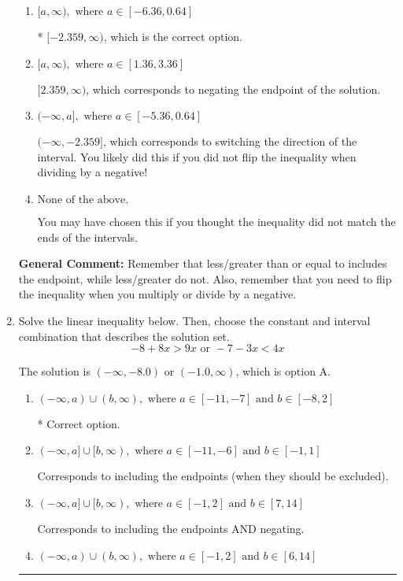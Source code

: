 \documentclass{extbook}[14pt]
\newcommand{\litem}[1]{\item #1

\rule{\textwidth}{0.4pt}}
\begin{document}
\begin{enumerate}
{\begin{enumerate}[label=\Alph*.]
 $(-\infty, 2.359]$, which corresponds to switching the direction of the interval AND negating the endpoint. You likely did this if you did not flip the inequality when dividing by a negative as well as not moving values over to a side properly.
\item \( [a, \infty), \text{ where } a \in [-6.36, 0.64] \)

* $[-2.359, \infty)$, which is the correct option.
\item \( [a, \infty), \text{ where } a \in [1.36, 3.36] \)

 $[2.359, \infty)$, which corresponds to negating the endpoint of the solution.
\item \( (-\infty, a], \text{ where } a \in [-5.36, 0.64] \)

 $(-\infty, -2.359]$, which corresponds to switching the direction of the interval. You likely did this if you did not flip the inequality when dividing by a negative!
\item \( \text{None of the above}. \)

You may have chosen this if you thought the inequality did not match the ends of the intervals.
\end{enumerate}

\textbf{General Comment:} Remember that less/greater than or equal to includes the endpoint, while less/greater do not. Also, remember that you need to flip the inequality when you multiply or divide by a negative.
}
\litem{
Solve the linear inequality below. Then, choose the constant and interval combination that describes the solution set.
\[ -8 + 8 x > 9 x \text{ or } -7 - 3 x < 4 x \]

The solution is \( (-\infty, -8.0) \text{ or } (-1.0, \infty) \), which is option A.\begin{enumerate}[label=\Alph*.]
\item \( (-\infty, a) \cup (b, \infty), \text{ where } a \in [-11, -7] \text{ and } b \in [-8, 2] \)

 * Correct option.
\item \( (-\infty, a] \cup [b, \infty), \text{ where } a \in [-11, -6] \text{ and } b \in [-1, 1] \)

Corresponds to including the endpoints (when they should be excluded).
\item \( (-\infty, a] \cup [b, \infty), \text{ where } a \in [-1, 2] \text{ and } b \in [7, 14] \)

Corresponds to including the endpoints AND negating.
\item \( (-\infty, a) \cup (b, \infty), \text{ where } a \in [-1, 2] \text{ and } b \in [6, 14] \)


\end{enumerate}}
\end{enumerate}
\end{document}
